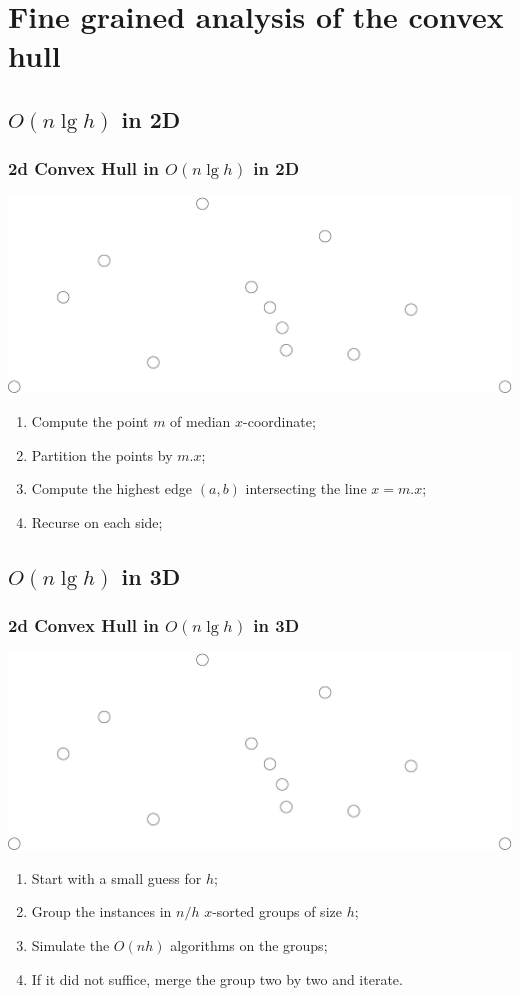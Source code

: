 \section{Fine grained analysis of the convex hull}

\subsection{$O(n\lg h)$ in 2D}
\begin{frame}
  \frametitle{2d Convex Hull in $O(n\lg h)$ in 2D}
  \includegraphics[width=\textwidth]{points}
  \begin{enumerate}
  \item Compute the point $m$ of median $x$-coordinate;
  \item Partition the points by $m.x$;
  \item Compute the highest edge $(a,b)$ intersecting the line $x=m.x$;
  \item Recurse on each side;
  \end{enumerate}
\end{frame}

\subsection{$O(n\lg h)$ in 3D}
\begin{frame}
  \frametitle{2d Convex Hull in $O(n\lg h)$ in 3D}
  \includegraphics[width=\textwidth]{points}
  \begin{enumerate}
  \item Start with a small guess for $h$;
  \item Group the instances in $n/h$ $x$-sorted groups of size $h$;
  \item Simulate the $O(nh)$ algorithms on the groups;
  \item If it did not suffice, merge the group two by two and iterate.
  \end{enumerate}
\end{frame}

